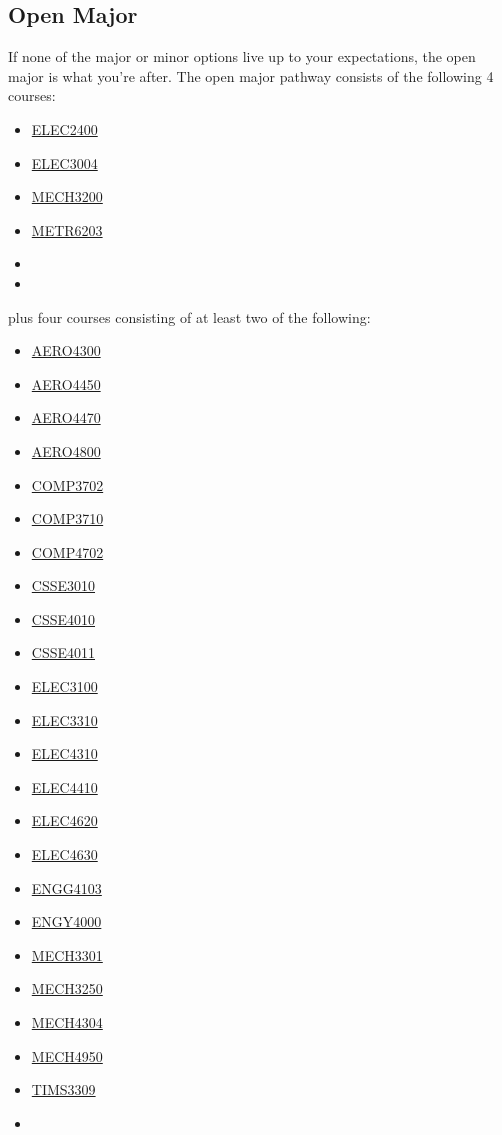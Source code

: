 \subsection{Open Major}
If none of the major or minor options live up to your expectations, the open major is what you're after. The open major pathway consists of the following 4 courses:
\begin{multicols}{3}
    \begin{itemize}
        \item \hyperlink{ELEC2400}{ELEC2400}
        \item \hyperlink{ELEC3004}{ELEC3004}
        \item \hyperlink{MECH3200}{MECH3200}
        \item \hyperlink{METR6203}{METR6203}
        \item[]
        \item[]
    \end{itemize}
\end{multicols}
plus four courses consisting of at least two of the following:
\begin{multicols}{3}
    \begin{itemize}
        \item \hyperlink{AERO4300}{AERO4300}
        \item \hyperlink{AERO4450}{AERO4450}
        \item \hyperlink{AERO4470}{AERO4470}
        \item \hyperlink{AERO4800}{AERO4800}
        \item \hyperlink{COMP3702}{COMP3702}
        \item \hyperlink{COMP3710}{COMP3710}
        \item \hyperlink{COMP4702}{COMP4702}
        \item \hyperlink{CSSE3010}{CSSE3010}
        \item \hyperlink{CSSE4010}{CSSE4010}
        \item \hyperlink{CSSE4011}{CSSE4011}
        \item \hyperlink{ELEC3100}{ELEC3100}
        \item \hyperlink{ELEC3310}{ELEC3310}
        \item \hyperlink{ELEC4310}{ELEC4310}
        \item \hyperlink{ELEC4410}{ELEC4410}
        \item \hyperlink{ELEC4620}{ELEC4620}
        \item \hyperlink{ELEC4630}{ELEC4630}
        \item \hyperlink{ENGG4103}{ENGG4103}
        \item \hyperlink{ENGY4000}{ENGY4000}
        \item \hyperlink{MECH3301}{MECH3301}
        \item \hyperlink{MECH3250}{MECH3250}
        \item \hyperlink{MECH4304}{MECH4304}
        \item \hyperlink{MECH4950}{MECH4950}
        \item \hyperlink{TIMS3309}{TIMS3309}
        \item[]
    \end{itemize}
\end{multicols}

